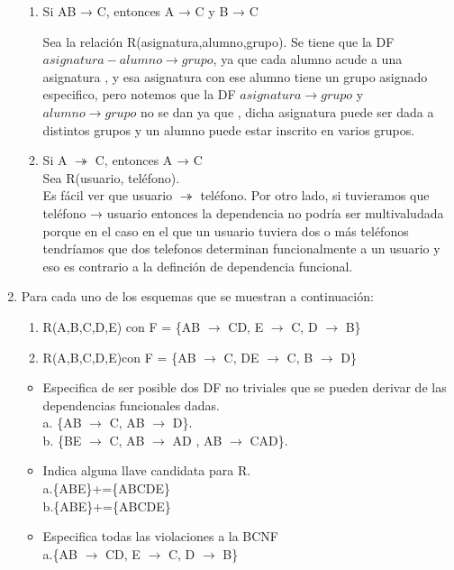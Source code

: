 \documentclass[a4paper, 12pt]{report}
\begin{document}
\begin{enumerate}
{\begin{enumerate}
	\item Si AB → C, entonces A → C y B → C
	
	
	Sea la relación R(asignatura,alumno,grupo).
	Se tiene que la DF $asignatura-alumno \rightarrow grupo$, ya que cada alumno acude a una asignatura , y esa asignatura con ese alumno tiene un grupo asignado especifico, pero notemos que la DF $asignatura \rightarrow grupo$ y $alumno \rightarrow grupo$ no se dan ya que , dicha asignatura puede ser dada a distintos grupos y un alumno puede estar inscrito en varios grupos.  

    \item Si A $\twoheadrightarrow$ C, entonces A → C\\

        Sea R(usuario, teléfono).\\
        Es fácil ver que usuario $\twoheadrightarrow$ teléfono. Por otro lado,
        si tuvieramos que teléfono → usuario entonces la dependencia no podría
        ser multivaludada porque en el caso en el que un usuario tuviera dos o
        más teléfonos tendríamos que dos telefonos determinan funcionalmente a
        un usuario y eso es contrario a la definción de dependencia funcional.
\end{enumerate}}
\item Para cada uno de los esquemas que se muestran a continuación:
\begin{enumerate}
	\item R(A,B,C,D,E) con F = \{AB $\rightarrow$ CD, E $\rightarrow$ C, D
		$\rightarrow$ B\}
	\item R(A,B,C,D,E)con F = \{AB $\rightarrow$ C, DE $\rightarrow$ C, B $\rightarrow$ D\}
\end{enumerate}
\begin{itemize}
	\item Especifica de  ser  posible dos DF  no  triviales que  se  pueden
	derivar  de  las  dependencias funcionales dadas.\\
	a. \{AB $\rightarrow$ C, AB $\rightarrow$ D\}.\\
	b. \{BE $\rightarrow$ C, AB $\rightarrow$ AD , AB $\rightarrow$ CAD\}.
	
	\item Indica alguna llave candidata para R.\\
	a.\{ABE\}+=\{ABCDE\}\\
	b.\{ABE\}+=\{ABCDE\}
	
	\item Especifica todas las violaciones a la BCNF\\
	a.\{AB $\rightarrow$ CD, E $\rightarrow$ C, D
	$\rightarrow$ B\}
	

\end{itemize}
\end{enumerate}
\end{document}
